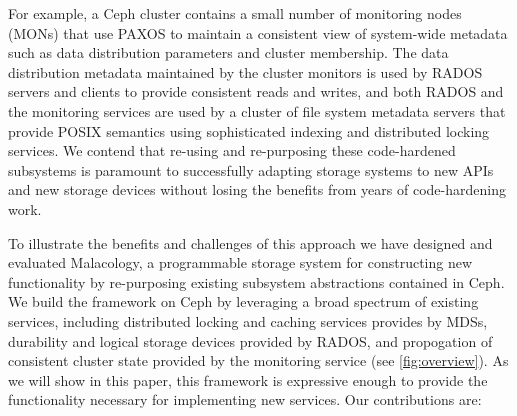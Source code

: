 \documentclass[10pt,twocolumn]{article}
\begin{document}
For example, a Ceph cluster contains a small number of
monitoring nodes (MONs) that use PAXOS to maintain a consistent view of
system-wide metadata such as data distribution parameters and cluster
membership. The data distribution metadata maintained by
the cluster monitors is used by RADOS servers and clients to provide
consistent reads and writes, and both RADOS and the monitoring services
are used by a cluster of file system metadata servers that provide POSIX
semantics using sophisticated indexing and distributed locking services.
We contend that re-using and re-purposing these code-hardened subsystems
is paramount to successfully adapting storage systems to new APIs and
new storage devices without losing the benefits from years of
code-hardening work.

To illustrate the benefits and challenges of this approach we have
designed and evaluated Malacology, a programmable storage system for
constructing new functionality by re-purposing existing subsystem
abstractions contained in Ceph. We build the framework on Ceph by
leveraging a broad spectrum of existing services, including distributed
locking and caching services provides by MDSs, durability and logical
storage devices provided by RADOS, and propogation of consistent cluster
state provided by the monitoring service (see \ref{fig:overview}). As we will show in this paper, this framework is expressive enough to provide the
functionality necessary for implementing new services. Our contributions
are:
\end{document}
